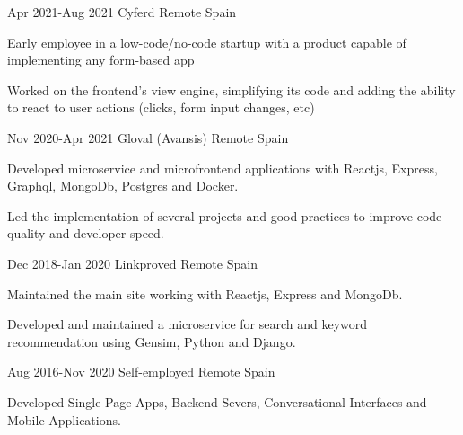 \documentclass[10pt]{CurriculumVitae}
\begin{document}
      {Apr 2021-Aug 2021}
      {Cyferd}
      {Remote}
      {Spain}
      {
        \item Early employee in a low-code/no-code startup with a product capable of implementing any form-based app
        \item Worked on the frontend's view engine, simplifying its code and adding the ability to react to user actions (clicks, form input changes, etc)
      }

      {Nov 2020-Apr 2021}
      {Gloval (Avansis)}
      {Remote}
      {Spain}
      {
        \item Developed microservice and microfrontend applications with Reactjs, Express, Graphql, MongoDb, Postgres and Docker.
        \item Led the implementation of several projects and good practices to improve code quality and developer speed. %
      }

      {Dec 2018-Jan 2020}
      {Linkproved}
      {Remote}
      {Spain}
      {
        \item Maintained the main site working with Reactjs, Express and MongoDb.
        \item Developed and maintained a microservice for search and keyword recommendation using Gensim, Python and Django.
      }
 
      {Aug 2016-Nov 2020}
      {Self-employed}
      {Remote}
      {Spain}
      {
        \item Developed Single Page Apps, Backend Severs, Conversational Interfaces and Mobile Applications.
      }
   
\end{document}
